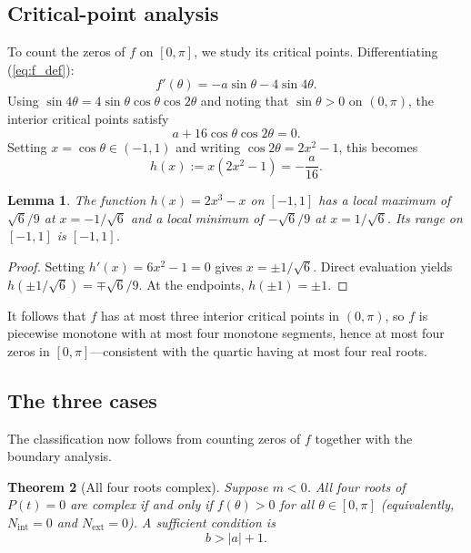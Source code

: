 \documentclass[12pt]{article}
\newtheorem{theorem}{Theorem}
\newtheorem{lemma}[theorem]{Lemma}
\theoremstyle{definition}
\theoremstyle{remark}
\begin{document}
\subsection{Critical-point analysis}

To count the zeros of $f$ on $[0,\pi]$, we study its critical points. Differentiating (\ref{eq:f_def}):
\[
f'(\theta) = -a\sin\theta - 4\sin 4\theta.
\]
Using $\sin 4\theta = 4\sin\theta\cos\theta\cos 2\theta$ and noting that $\sin\theta > 0$ on $(0,\pi)$, the interior critical points satisfy
\begin{equation}\label{eq:crit_quartic}
a + 16\cos\theta\cos 2\theta = 0.
\end{equation}
Setting $x = \cos\theta \in (-1,1)$ and writing $\cos 2\theta = 2x^2 - 1$, this becomes
\begin{equation}\label{eq:h_cubic}
h(x) := x(2x^2 - 1) = -\frac{a}{16}.
\end{equation}

\begin{lemma}\label{lem:h_range}
The function $h(x) = 2x^3 - x$ on $[-1,1]$ has a local maximum of $\sqrt{6}/9$ at $x = -1/\sqrt{6}$ and a local minimum of $-\sqrt{6}/9$ at $x = 1/\sqrt{6}$. Its range on $[-1,1]$ is $[-1,1]$.
\end{lemma}

\begin{proof}
Setting $h'(x) = 6x^2 - 1 = 0$ gives $x = \pm 1/\sqrt{6}$. Direct evaluation yields $h(\pm 1/\sqrt{6}) = \mp\sqrt{6}/9$. At the endpoints, $h(\pm 1) = \pm 1$.
\end{proof}

It follows that $f$ has at most three interior critical points in $(0,\pi)$, so $f$ is piecewise monotone with at most four monotone segments, hence at most four zeros in $[0,\pi]$---consistent with the quartic having at most four real roots.

\subsection{The three cases}

The classification now follows from counting zeros of $f$ together with the boundary analysis.

\begin{theorem}[All four roots complex]\label{thm:four_complex}
Suppose $m < 0$. All four roots of $P(t) = 0$ are complex if and only if $f(\theta) > 0$ for all $\theta \in [0,\pi]$ (equivalently, $N_{\mathrm{int}} = 0$ and $N_{\mathrm{ext}} = 0$). A sufficient condition is
\begin{equation}\label{eq:four_complex_suff}
b > |a| + 1.
\end{equation}
\end{theorem}
\end{document}
